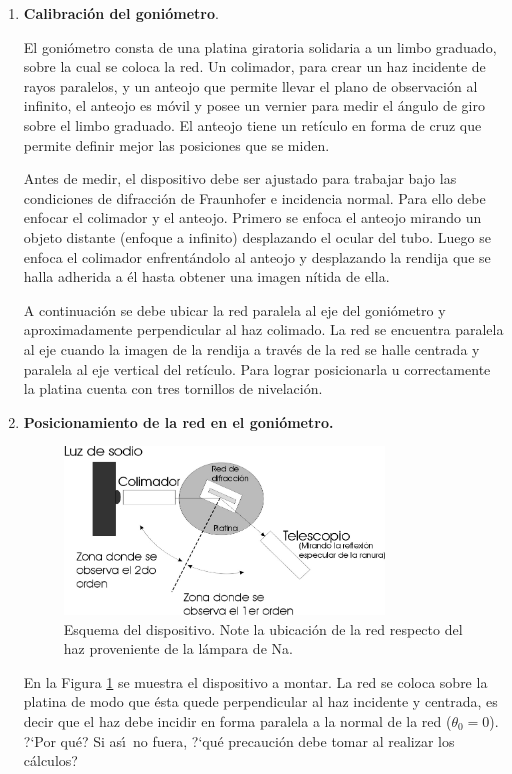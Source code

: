 \documentclass[laboratorio]{guia}
\begin{document}
\begin{enumerate}
\item {\bf Calibraci\'on del goni\'ometro}. 

El goni\'ometro consta de una platina giratoria solidaria a un limbo graduado,
sobre la cual se coloca la red. Un colimador, para crear un haz incidente de 
rayos paralelos, y un anteojo que permite llevar el plano de observación al 
infinito, el anteojo es móvil y posee un vernier para medir el ángulo de giro
sobre el limbo graduado. El anteojo tiene un retículo en forma de cruz que 
permite definir mejor las posiciones que se miden.

Antes de medir, el dispositivo debe ser ajustado para trabajar bajo las 
condiciones de difracción de Fraunhofer e incidencia normal. Para ello debe 
enfocar el colimador y el anteojo. Primero se enfoca el anteojo mirando un 
objeto distante (enfoque a infinito) desplazando el ocular del tubo. Luego se 
enfoca el colimador enfrentándolo al anteojo y desplazando la rendija que se 
halla adherida a él hasta obtener una imagen nítida de ella.

A continuación se debe ubicar la red paralela al eje del goniómetro y 
aproximadamente perpendicular al haz colimado. La red se encuentra paralela 
al eje cuando la imagen de la rendija a través de la red se halle centrada 
y paralela al eje vertical del retículo. Para lograr posicionarla 
u correctamente la platina cuenta con tres tornillos de nivelación.


\item {\bf Posicionamiento de la red en el goni\'ometro.} %

\begin{figure}[t!]
    \centering
    \includegraphics[width=8.5cm]{LG11--002.png}
    \caption{Esquema del dispositivo. Note la ubicación de la red respecto del haz proveniente de la lámpara de Na.
    }
    \label{fig:1}
\end{figure}

En la Figura \ref{fig:1} se muestra el dispositivo a montar. La red se coloca 
sobre la platina de modo que \'esta quede perpendicular al haz 
incidente y centrada, es decir que el haz debe incidir en forma 
paralela a la normal de la red ($\theta_0 = 0$). ?`Por qu\'e? Si 
as\'\i\ no fuera, ?`qu\'e precauci\'on debe tomar al realizar los 
c\'alculos?


\end{enumerate}
\end{document}
